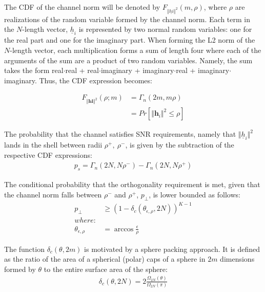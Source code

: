 The CDF of the channel norm will be denoted by $F_{\Vert\underline{hi}\Vert^2}(m,\rho)$, where $\rho$ are realizations of the random variable formed by the channel norm. Each term in the $N$-length vector, $\underline{h}_i$ is represented by two normal random variables: one for the real part and one for the imaginary part. When forming the L2 norm of the $N$-length vector, each multiplication forms a sum of length four where each of the arguments of the sum are a product of two random variables. Namely, the sum takes the form real$\cdot$real + real$\cdot$imaginary + imaginary$\cdot$real + imaginary$\cdot$imaginary. Thus, the CDF expression becomes:

\begin{equation}\label{eq:ch_sq_cdf_chan}
    \begin{aligned}
        F_{\Vert\textbf{hi}\Vert^2}(\rho;m)& = \Gamma_n(2m,m\rho)\\
        &= Pr[\Vert\textbf{h}_i\Vert^2 \leq \rho]
    \end{aligned}
\end{equation}

The probability that the channel satisfies SNR requirements, namely that $\Vert\underline{h}_i\Vert^2$ lands in the shell between radii $\rho^+,\ \rho^-$,  is given by the subtraction of the respective CDF expressions:
\begin{equation}\label{eq:p_s}
    \begin{aligned}
        p_s = \Gamma_n(2N,N\rho^-) - \Gamma_n(2N,N\rho^+)
    \end{aligned}
\end{equation}

The conditional probability that the orthogonality requirement is met, given that the channel norm falls between $\rho^-$ and $\rho^+$, $p_\perp$, is lower bounded as follows:
\begin{equation}\label{eq:p_perp}
    \begin{aligned}
        p_\perp &\geq (1-\delta_c(\theta_{\epsilon,\rho},2N))^{K-1}\\
        where:\\
        \theta_{\epsilon,\rho} &= \arccos\frac{\epsilon}{\rho}
    \end{aligned}
\end{equation}

The function $\delta_c(\theta,2m)$ is motivated by a sphere packing approach. It is defined as the ratio of the area of a spherical (polar) caps of a sphere in $2m$ dimensions formed by $\theta$ to the entire surface area of the sphere:
\begin{equation}\label{eq:delta_c_sphere}
    \begin{aligned}
        \delta_c(\theta,2N) = 2\frac{\Omega_{2N}(\theta)}{\Omega_{2N}(\pi)}
    \end{aligned}
\end{equation}

